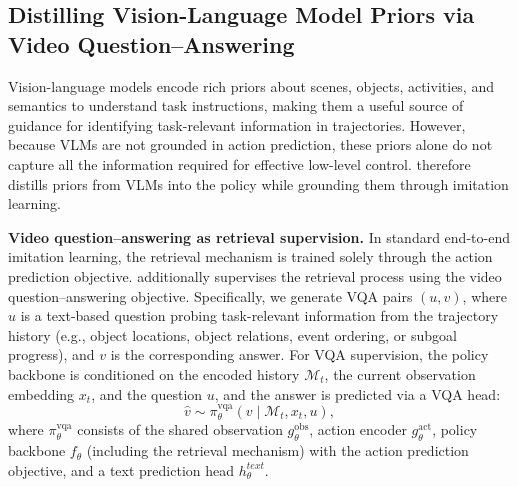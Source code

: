 \subsection{Distilling Vision-Language Model Priors via Video Question--Answering}\label{sec:method:vqa-train}

Vision-language models encode rich priors about scenes, objects, activities, and semantics to understand task instructions, making them a useful source of guidance for identifying task-relevant information in trajectories.
However, because VLMs are not grounded in action prediction, these priors alone do not capture all the information required for effective low-level control.
\ourmethod{} therefore distills priors from VLMs into the policy while grounding them through imitation learning.

\vspace{0.5em}
\noindent
\textbf{Video question--answering as retrieval supervision.}
In standard end-to-end imitation learning, the retrieval mechanism is trained solely through the action prediction objective.
\ourmethod{} additionally supervises the retrieval process using the video question--answering objective.
Specifically, we generate VQA pairs $(u, v)$, where $u$ is a text-based question probing task-relevant information from the trajectory history (e.g., object locations, object relations, event ordering, or subgoal progress), and $v$ is the corresponding answer.
For VQA supervision, the policy backbone is conditioned on the encoded history $\mathcal{M}_t$, the current observation embedding $x_t$, and the question $u$, and the answer is predicted via a VQA head:
\begin{equation}
    \hat{v} \sim \pi_\theta^{\text{vqa}}(v \mid \mathcal{M}_t, x_t, u),
\end{equation}
where $\pi_\theta^{\text{vqa}}$ consists of the shared observation $g_\theta^{\text{obs}}$, action encoder $g_\theta^{\text{act}}$, policy backbone $f_\theta$ (including the retrieval mechanism) with the action prediction objective, and a text prediction head $h_\theta^{text}$.

